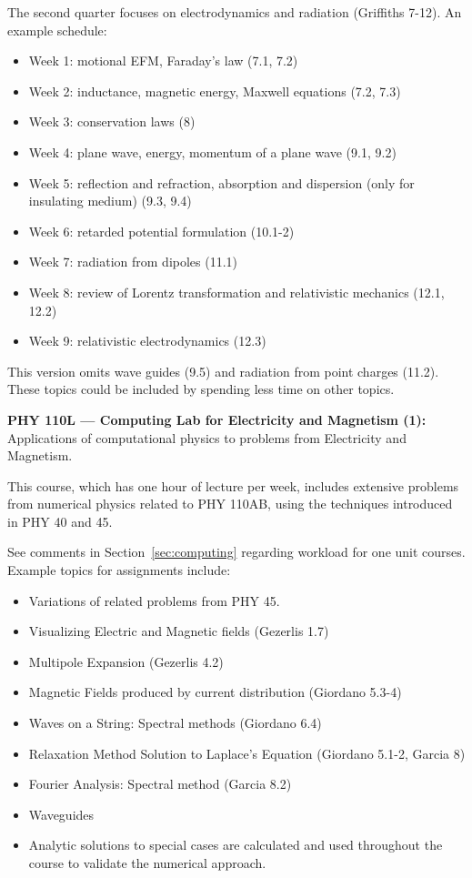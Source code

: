 \documentclass[12pt]{article}
\begin{document}
The second quarter focuses on electrodynamics and radiation (Griffiths 7-12).
An example schedule:
\begin{itemize}
\item Week 1: motional EFM, Faraday’s law (7.1, 7.2)
\item Week 2: inductance, magnetic energy, Maxwell equations (7.2, 7.3)
\item Week 3: conservation laws (8)
\item Week 4: plane wave, energy, momentum of a plane wave (9.1, 9.2)
\item Week 5: reflection and refraction, absorption and dispersion (only for insulating medium) (9.3, 9.4)
\item Week 6: retarded potential formulation (10.1-2)
\item Week 7: radiation from dipoles (11.1)
\item Week 8: review of Lorentz transformation and relativistic mechanics (12.1, 12.2)
\item Week 9: relativistic electrodynamics (12.3)
\end{itemize}
This version omits wave guides (9.5) and radiation from point charges
(11.2).  These topics could be included by spending less time on other
topics.
\newpage

\vskip 1cm
\noindent
{\bf PHY 110L --- Computing Lab for Electricity and Magnetism (1):}
Applications of computational physics to problems from Electricity and
Magnetism.

This course, which has one hour of lecture per week, includes
extensive problems from numerical physics related to PHY 110AB, using
the techniques introduced in PHY 40 and 45.

See comments in Section~\ref{sec:computing} regarding workload for one
unit courses.  Example topics for assignments include:
\begin{itemize}
\item Variations of related problems from PHY 45.
\item Visualizing Electric and Magnetic fields (Gezerlis 1.7)
\item Multipole Expansion (Gezerlis 4.2)
\item Magnetic Fields produced by current distribution (Giordano 5.3-4)
\item Waves on a String: Spectral methods (Giordano 6.4)
\item Relaxation Method Solution to Laplace's Equation (Giordano 5.1-2, Garcia 8)
\item Fourier Analysis:  Spectral method (Garcia 8.2)
\item Waveguides
\item Analytic solutions to special cases are calculated and used throughout the
  course to validate the numerical approach.
\end{itemize}
\end{document}
